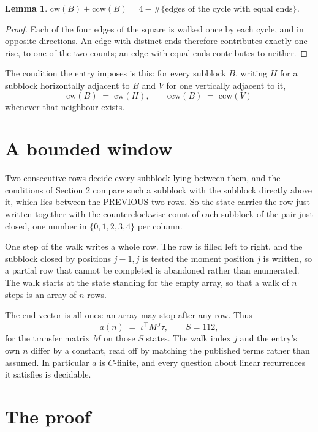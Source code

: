 \documentclass[11pt,a4paper]{article}
\theoremstyle{plain}
\newtheorem{lemma}[theorem]{Lemma}
\theoremstyle{definition}
\begin{document}
\begin{lemma}\label{lem:sum}
$\mathrm{cw}(B)+\mathrm{ccw}(B)=4-\#\{\text{edges of the cycle with equal ends}\}$.
\end{lemma}

\begin{proof}
Each of the four edges of the square is walked once by each cycle, and in opposite directions.
An edge with distinct ends therefore contributes exactly one rise, to one of the two counts;
an edge with equal ends contributes to neither.
\end{proof}

The condition the entry imposes is this: for every subblock $B$, writing $H$ for a subblock horizontally adjacent to $B$ and $V$ for one vertically adjacent to it,
\[
\mathrm{cw}(B)\;=\;\mathrm{cw}(H),\qquad \mathrm{ccw}(B)\;=\;\mathrm{ccw}(V)
\]
whenever that neighbour exists.

\section{A bounded window}

Two consecutive rows decide every subblock lying between them, and the conditions of Section 2 compare such a subblock with the subblock directly above it, which lies between the PREVIOUS two rows. So the state carries the row just written together with the counterclockwise count of each subblock of the pair just closed, one number in $\{0,1,2,3,4\}$ per column.

One step of the walk writes a whole row. The row is filled left to right, and the subblock
closed by positions $j-1,j$ is tested the moment position $j$ is written, so a partial row that
cannot be completed is abandoned rather than enumerated. The walk starts at the state standing
for the empty array, so that a walk of $n$ steps is an array of $n$ rows.

The end vector is all ones: an array may stop after any row. Thus
\[
a(n)\;=\;\iota^{\!\top}M^{\,j}\tau ,\qquad S=112,
\]
for the transfer matrix $M$ on those $S$ states. The walk index $j$ and the entry's own $n$
differ by a constant, read off by matching the published terms rather than assumed. In
particular $a$ is $C$-finite, and every question about linear recurrences it satisfies is
decidable.

\section{The proof}
\end{document}
